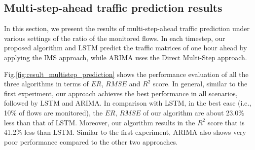 \begin{table}[]
\caption{The prediction results of ARIMA}
\label{table:arima_results}
\vspace{-10pt}
\end{table}
\subsection{Multi-step-ahead traffic prediction results}
In this section, we present the results of multi-step-ahead traffic prediction under various settings of the ratio of the monitored flows. 
In each timestep, our proposed algorithm and LSTM predict the traffic matrices of one hour ahead by applying the IMS approach, while ARIMA uses the Direct Multi-Step approach.

Fig.\ref{fig:result_multistep_prediction} shows the performance evaluation of all the three algorithms in terms of $ER$, $RMSE$ and $R^2$ score.
In general, similar to the first experiment, our approach achieves the best performance in all scenarios, followed by LSTM and ARIMA. In comparison with LSTM, 
in the best case (i.e., 10$\%$ of flows are monitored), the  $ER$, $RMSE$ of our algorithm are about 23.0$\%$ less than that of LSTM. 
Moreover, our algorithm results in the $R^2$ score that is 41.2$\%$ less than LSTM.  
Similar to the first experiment, ARIMA also shows very poor performance compared to the other two approaches. 

